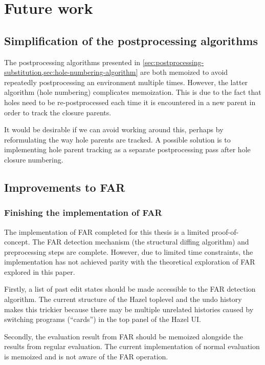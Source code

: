 \chapter{Future work}
\label{sec:future_work}

\section{Simplification of the postprocessing algorithms}
\label{sec:postprocessing-simplification}

The postprocessing algorithms presented in \cref{sec:postprocessing-substitution,sec:hole-numbering-algorithm} are both memoized to avoid repeatedly postprocessing an environment multiple times. However, the latter algorithm (hole numbering) complicates memoization. This is due to the fact that holes need to be re-postprocessed each time it is encountered in a new parent in order to track the closure parents.

It would be desirable if we can avoid working around this, perhaps by reformulating the way hole parents are tracked. A possible solution is to implementing hole parent tracking as a separate postprocessing pass after hole closure numbering.

\section{Improvements to FAR}
\label{sec:far-improvements}

\subsection{Finishing the implementation of FAR}
\label{sec:finishing-far}

The implementation of FAR completed for this thesis is a limited proof-of-concept. The FAR detection mechanism (the structural diffing algorithm) and preprocessing steps are complete. However, due to limited time constraints, the implementation has not achieved parity with the theoretical exploration of FAR explored in this paper.

Firstly, a list of past edit states should be made accessible to the FAR detection algorithm. The current structure of the Hazel toplevel and the undo history makes this trickier because there may be multiple unrelated histories caused by switching programs (``cards'') in the top panel of the Hazel UI.

Secondly, the evaluation result from FAR should be memoized alongside the results from regular evaluation. The current implementation of normal evaluation is memoized and is not aware of the FAR operation.

